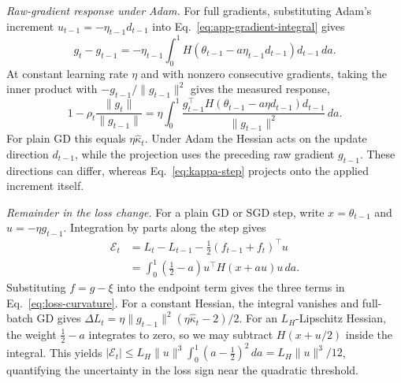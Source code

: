 \emph{Raw-gradient response under Adam.} For full gradients, substituting Adam's increment $u_{t-1}=-\eta_{t-1}d_{t-1}$ into Eq.~\eqref{eq:app-gradient-integral} gives
\begin{equation}
 g_t-g_{t-1}=-\eta_{t-1}\int_0^1
 H(\theta_{t-1}-a\eta_{t-1}d_{t-1})d_{t-1}\,da.
 \label{eq:adam-gradient-response}
\end{equation}
At constant learning rate $\eta$ and with nonzero consecutive gradients, taking the inner product with $-g_{t-1}/\|g_{t-1}\|^2$ gives the measured response,
\begin{equation}
  1-\rho_t\frac{\|g_t\|}{\|g_{t-1}\|}
  =\eta\int_0^1
   \frac{g_{t-1}^{\top}H(\theta_{t-1}-a\eta d_{t-1})d_{t-1}}
        {\|g_{t-1}\|^2}\,da.
  \label{eq:adam-projected-response}
\end{equation}
For plain GD this equals $\eta\widehat\kappa_t$. Under Adam the Hessian acts on the update direction $d_{t-1}$, while the projection uses the preceding raw gradient $g_{t-1}$. These directions can differ, whereas Eq.~\eqref{eq:kappa-step} projects onto the applied increment itself.

\emph{Remainder in the loss change.} For a plain GD or SGD step, write $x=\theta_{t-1}$ and $u=-\eta g_{t-1}$. Integration by parts along the step gives
\begin{equation}
 \begin{aligned}
 \mathcal E_t
 &=L_t-L_{t-1}-\tfrac12(f_{t-1}+f_t)^\top u\\
 &=\int_0^1(\tfrac12-a)u^\top H(x+a u)u\,da.
 \end{aligned}
 \label{eq:app-loss-remainder}
\end{equation}
Substituting $f=g-\xi$ into the endpoint term gives the three terms in Eq.~\eqref{eq:loss-curvature}. For a constant Hessian, the integral vanishes and full-batch GD gives $\Delta L_t=\eta\|g_{t-1}\|^2(\eta\widehat\kappa_t-2)/2$. For an $L_H$-Lipschitz Hessian, the weight $\tfrac12-a$ integrates to zero, so we may subtract $H(x+u/2)$ inside the integral. This yields $|\mathcal E_t|\le L_H\|u\|^3\int_0^1(a-\tfrac12)^2\,da=L_H\|u\|^3/12$, quantifying the uncertainty in the loss sign near the quadratic threshold.
